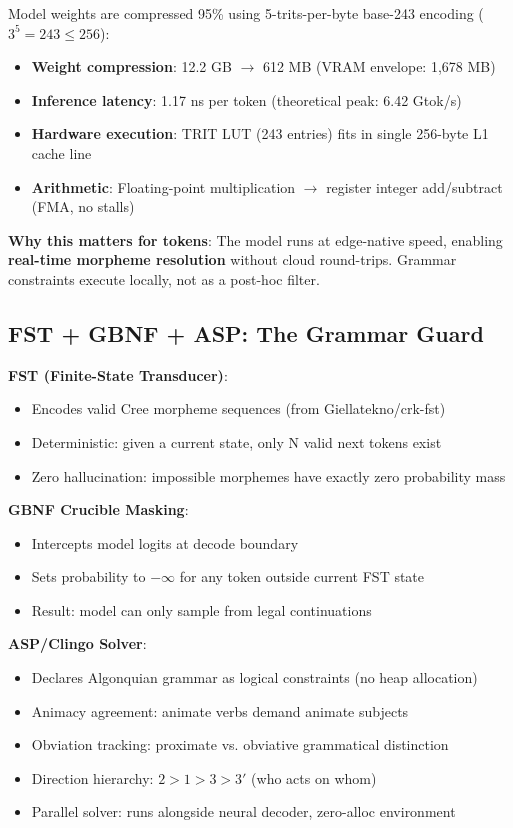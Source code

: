 \documentclass[11pt,oneside]{article}
\begin{document}
Model weights are compressed 95\% using 5-trits-per-byte base-243 encoding ($3^5 = 243 \leq 256$):

\begin{itemize}
  \item \textbf{Weight compression}: 12.2 GB $\to$ 612 MB (VRAM envelope: 1,678 MB)
  \item \textbf{Inference latency}: 1.17 ns per token (theoretical peak: 6.42 Gtok/s)
  \item \textbf{Hardware execution}: TRIT LUT (243 entries) fits in single 256-byte L1 cache line
  \item \textbf{Arithmetic}: Floating-point multiplication $\to$ register integer add/subtract (FMA, no stalls)
\end{itemize}

\textbf{Why this matters for tokens}: The model runs at edge-native speed, enabling \textbf{real-time morpheme resolution} without cloud round-trips. Grammar constraints execute locally, not as a post-hoc filter.

\subsection{FST + GBNF + ASP: The Grammar Guard}

\textbf{FST (Finite-State Transducer)}:
\begin{itemize}
  \item Encodes valid Cree morpheme sequences (from Giellatekno/crk-fst)
  \item Deterministic: given a current state, only N valid next tokens exist
  \item Zero hallucination: impossible morphemes have exactly zero probability mass
\end{itemize}

\textbf{GBNF Crucible Masking}:
\begin{itemize}
  \item Intercepts model logits at decode boundary
  \item Sets probability to $-\infty$ for any token outside current FST state
  \item Result: model can only sample from legal continuations
\end{itemize}

\textbf{ASP/Clingo Solver}:
\begin{itemize}
  \item Declares Algonquian grammar as logical constraints (no heap allocation)
  \item Animacy agreement: animate verbs demand animate subjects
  \item Obviation tracking: proximate vs. obviative grammatical distinction
  \item Direction hierarchy: $2 > 1 > 3 > 3'$ (who acts on whom)
  \item Parallel solver: runs alongside neural decoder, zero-alloc environment
\end{itemize}
\end{document}
